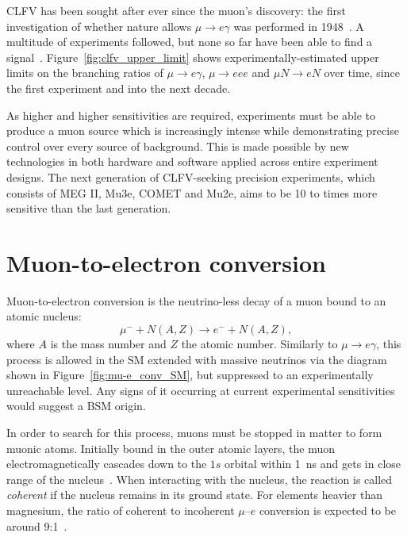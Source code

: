 CLFV has been sought after ever since the muon's discovery: the first
investigation of whether nature allows $\mu \rightarrow e \gamma$ was performed
in 1948~\cite{PhysRev.73.257}. A multitude of experiments followed, but none so
far have been able to find a signal~\cite{BERNSTEIN201327}.
Figure~\ref{fig:clfv_upper_limit} shows experimentally-estimated upper limits on
the branching ratios of $\mu \rightarrow e\gamma$, $\mu\rightarrow eee$ and $\mu
N \rightarrow e N$ over time, since the first experiment and into the next
decade. 

As higher and higher sensitivities are required, experiments must be able to
produce a muon source which is increasingly intense while demonstrating
precise control over every source of background. This is made possible by new
technologies in both hardware and software applied across entire experiment
designs. The next generation of CLFV-seeking precision experiments, which
consists of MEG II, Mu3e, COMET and Mu2e, aims to be 10 to 
times more sensitive than the last generation.


\section{Muon-to-electron conversion}
Muon-to-electron conversion is the neutrino-less decay of a muon bound to an
atomic nucleus:
$$
\mu^- + N(A, Z) \rightarrow e^- + N(A, Z),
$$
where $A$ is the mass number and $Z$ the atomic number.
Similarly to $\mu\rightarrow e\gamma$, this process is allowed in the SM
extended with massive neutrinos via the diagram shown in
Figure~\ref{fig:mu-e_conv_SM}, but suppressed to an experimentally
unreachable level. Any signs of it occurring at current experimental
sensitivities would suggest a BSM origin.

In order to search for this process, muons must be stopped in matter to form
muonic atoms. Initially bound in the outer atomic layers, the muon
electromagnetically cascades down to the $1s$ orbital within \SI{1}{\ns}
and gets in close range of the nucleus~\cite{Knecht2020}. 
When interacting with the nucleus, the reaction is called \emph{coherent} if the
nucleus remains in its ground state. For elements heavier than magnesium, the
ratio of coherent to incoherent $\mu$--$e$ conversion is expected to be around
9:1~\cite{CHIANG1993526}.

